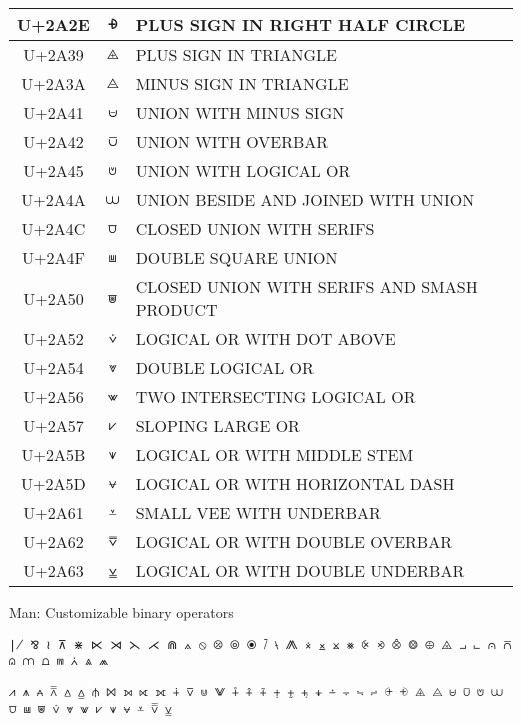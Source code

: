 \documentclass[a4paper]{article}
\begin{document}
\begin{longtable}{ccl}
  U+2A2E & \texttt{⨮}  & PLUS SIGN IN RIGHT HALF CIRCLE \\ \hline
  U+2A39 & \texttt{⨹}  & PLUS SIGN IN TRIANGLE \\ \hline
  U+2A3A & \texttt{⨺}  & MINUS SIGN IN TRIANGLE \\ \hline
  U+2A41 & \texttt{⩁}  & UNION WITH MINUS SIGN \\ \hline
  U+2A42 & \texttt{⩂}  & UNION WITH OVERBAR \\ \hline
  U+2A45 & \texttt{⩅}  & UNION WITH LOGICAL OR \\ \hline
  U+2A4A & \texttt{⩊}  & UNION BESIDE AND JOINED WITH UNION \\ \hline
  U+2A4C & \texttt{⩌}  & CLOSED UNION WITH SERIFS \\ \hline
  U+2A4F & \texttt{⩏}  & DOUBLE SQUARE UNION \\ \hline
  U+2A50 & \texttt{⩐}  & CLOSED UNION WITH SERIFS AND SMASH PRODUCT \\ \hline
  U+2A52 & \texttt{⩒}  & LOGICAL OR WITH DOT ABOVE \\ \hline
  U+2A54 & \texttt{⩔}  & DOUBLE LOGICAL OR \\ \hline
  U+2A56 & \texttt{⩖}  & TWO INTERSECTING LOGICAL OR \\ \hline
  U+2A57 & \texttt{⩗}  & SLOPING LARGE OR \\ \hline
  U+2A5B & \texttt{⩛}  & LOGICAL OR WITH MIDDLE STEM \\ \hline
  U+2A5D & \texttt{⩝}  & LOGICAL OR WITH HORIZONTAL DASH \\ \hline
  U+2A61 & \texttt{⩡}  & SMALL VEE WITH UNDERBAR \\ \hline
  U+2A62 & \texttt{⩢}  & LOGICAL OR WITH DOUBLE OVERBAR \\ \hline
  U+2A63 & \texttt{⩣}  & LOGICAL OR WITH DOUBLE UNDERBAR \\ \hline

  \bottomrule
\end{longtable}

Man: Customizable binary operators

\texttt{∤ ⅋ ≀ ⊼ ⋇ ⋉ ⋊ ⋋ ⋌ ⋒ ⟑ ⦸ ⦼ ⦾ ⦿ ⧶ ⧷ ⨇ ⨰ ⨱ ⨲ ⨳ ⨴ ⨵ ⨶ ⨷ ⨸ ⨻ ⨼ ⨽ ⩀ ⩃ ⩄ ⩋ ⩍ ⩎ ⩑ ⩓ ⩕ } 

\texttt{⩘ ⩚ ⩜ ⩞ ⩟ ⩠ ⫛ ⨝ ⟕ ⟖ ⟗ ∔ ⊽ ⋓ ⨈ ⨢ ⨣ ⨤ ⨥ ⨦ ⨧ ⨨ ⨩ ⨪ ⨫ ⨬ ⨭ ⨮ ⨹ ⨺ ⩁ ⩂ ⩅ ⩊ ⩌ ⩏ ⩐ ⩒ ⩔ ⩖ ⩗ ⩛ ⩝ ⩡ ⩢ ⩣ }
\end{document}
